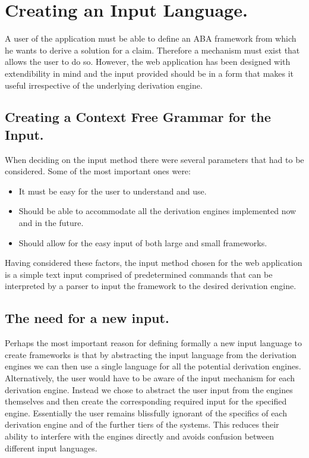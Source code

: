 \newpage

\chapter{Creating an Input Language.}

A user of the application must be able to define an ABA framework from which he wants to derive a solution for a claim. Therefore a mechanism must exist that allows the user to do so. However, the web application has been designed with extendibility in mind and the input provided should be in a form that makes it useful irrespective of the underlying derivation engine.

\section{Creating a Context Free Grammar for the Input.}

When deciding on the input method there were several parameters that had to be considered. Some of the most important ones were:

\begin{itemize}
\item It must be easy for the user to understand and use.
\item Should be able to accommodate all the derivation engines implemented now and in the future.
\item Should allow for the easy input of both large and small frameworks.
\end{itemize}

Having considered these factors, the input method chosen for the web application is a simple text input comprised of predetermined commands that can be interpreted by a parser to input the framework to the desired derivation engine.

\section{The need for a new input.}

Perhaps the most important reason for defining formally a new input language to create frameworks is that by abstracting the input language from the derivation engines we can then use a single language for all the potential derivation engines. Alternatively, the user would have to be aware of the input mechanism for each derivation engine. Instead we chose to abstract the user input from the engines themselves and then create the corresponding required input for the specified engine. Essentially the user remains blissfully ignorant of the specifics of each derivation engine and of the further tiers of the systems. This reduces their ability to interfere with the engines directly and avoids confusion between different input languages.


